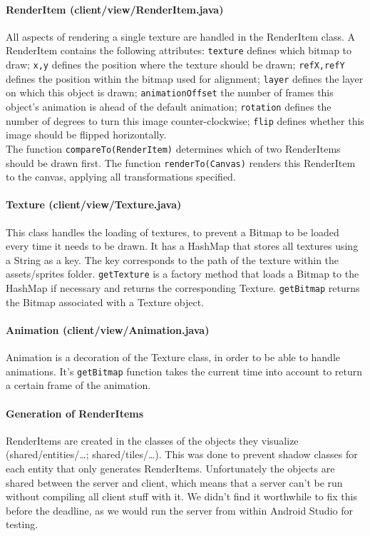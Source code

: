 \documentclass[../main.tex]{subfiles}
\begin{document}
        \paragraph{RenderItem (\tiny client/view/RenderItem.java\normalsize)} All aspects of rendering a single texture are handled in the RenderItem class. A RenderItem contains the following attributes: \texttt{texture} defines which bitmap to draw; \texttt{x,y} defines the position where the texture should be drawn; \texttt{refX,refY} defines the position within the bitmap used for alignment; \texttt{layer} defines the layer on which this object is drawn; \texttt{animationOffset} the number of frames this object's animation is ahead of the default animation; \texttt{rotation} defines the number of degrees to turn this image counter-clockwise; \texttt{flip} defines whether this image should be flipped horizontally.\\
        The function \texttt{compareTo(RenderItem)} determines which of two RenderItems should be drawn first. The function \texttt{renderTo(Canvas)} renders this RenderItem to the canvas, applying all transformations specified.

        \paragraph{Texture (\tiny client/view/Texture.java\normalsize)} This class handles the loading of textures, to prevent a Bitmap to be loaded every time it needs to be drawn. It has a HashMap that stores all textures using a String as a key. The key corresponds to the path of the texture within the assets/sprites folder. \texttt{getTexture} is a factory method that loads a Bitmap to the HashMap if necessary and returns the corresponding Texture. \texttt{getBitmap} returns the Bitmap associated with a Texture object.

        \paragraph{Animation (\tiny client/view/Animation.java\normalsize)} Animation is a decoration of the Texture class, in order to be able to handle animations. It's \texttt{getBitmap} function takes the current time into account to return a certain frame of the animation.

        \paragraph{Generation of RenderItems} RenderItems are created in the classes of the objects they visualize (\tiny shared/entities/\dots; shared/tiles/\dots\normalsize). This was done to prevent shadow classes for each entity that only generates RenderItems. Unfortunately the objects are shared between the server and client, which means that a server can't be run without compiling all client stuff with it. We didn't find it worthwhile to fix this before the deadline, as we would run the server from within Android Studio for testing. 
\end{document}

